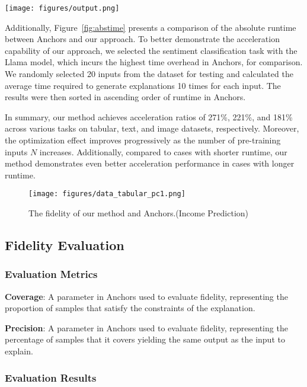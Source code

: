 \begin{figure*}[t]
\centering
\texttt{[image: figures/output.png]} 
\caption{The absolute time cost comparison before and after acceleration.(Sentiment Analysis)}
\label{fig:abstime}
\end{figure*}

Additionally, Figure~\ref{fig:abstime} presents a comparison of the absolute runtime between Anchors and our approach. To better demonstrate the acceleration capability of our approach, we selected the sentiment classification task with the Llama model, which incurs the highest time overhead in Anchors, for comparison. We randomly selected 20 inputs from the dataset for testing and calculated the average time required to generate explanations 10 times for each input. The results were then sorted in ascending order of runtime in Anchors.
%

In summary, our method achieves acceleration ratios of 271\%, 221\%, and 181\% across various tasks on tabular, text, and image datasets, respectively. Moreover, the optimization effect improves progressively as the number of pre-training inputs \(N\) increases. Additionally, compared to cases with shorter runtime, our method demonstrates even better acceleration performance in cases with longer runtime.

\begin{figure}[]
\centering
\texttt{[image: figures/data\_tabular\_pc1.png]} 
\caption{The fidelity of our method and Anchors.(Income Prediction)}
\label{fig:fidelity}
\end{figure}

\subsection{Fidelity Evaluation}

\subsubsection{Evaluation Metrics}

\textbf{Coverage}: A parameter in Anchors used to evaluate fidelity, representing the proportion of samples that satisfy the constraints of the explanation.

\textbf{Precision}: A parameter in Anchors used to evaluate fidelity, representing the percentage of samples that it covers yielding the same output as the input to explain.

\subsubsection{Evaluation Results}

